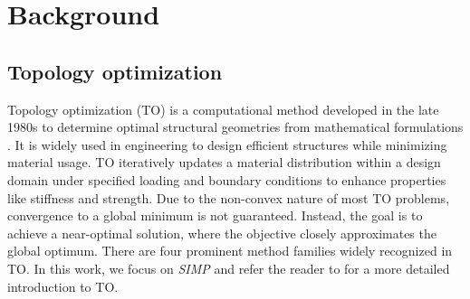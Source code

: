
\section{Background} 
\label{sec:preliminaries}




\subsection{Topology optimization}
\label{subsec:TO}
Topology optimization (TO) is a computational method developed in the late 1980s to determine optimal structural geometries from mathematical formulations \citep{BENDSOE1988197}. It is widely used in engineering to design efficient structures while minimizing material usage.
TO iteratively updates a material distribution within a design domain under specified loading and boundary conditions to enhance properties like stiffness and strength. 
Due to the non-convex nature of most TO problems, convergence to a global minimum is not guaranteed. Instead, the goal is to achieve a near-optimal solution, where the objective closely approximates the global optimum.
There are four prominent method families widely recognized in TO.
In this work, we focus on \emph{SIMP} and refer the reader to \citet{yago_topology_2022} for a more detailed introduction to TO.




